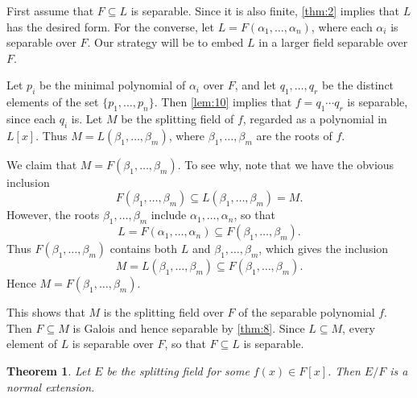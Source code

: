 \documentclass[leqno]{article}
\makeatletter
\newtheorem{theorem}{Theorem}
\theoremstyle{definition}
\theoremstyle{remark}
\let\oldproofname=\proofname
\renewcommand{\proofname}{\textit{\oldproofname}}
\theoremstyle{definition}
\renewenvironment{proof}[1][\proofname]{\par
  \pushQED{\qed}%
  \normalfont \topsep6\p@\@plus6\p@\relax
  \list{}{\leftmargin=0mm
          \rightmargin=0mm
          \settowidth{\itemindent}{\itshape#1}%
          \labelwidth=\itemindent
          \parsep=0pt \listparindent=0mm%
  }
  \item[\hskip\labelsep
        \itshape
    #1\@addpunct{.}]\ignorespaces
}{%
  \popQED\endlist\@endpefalse
}
\makeatother
\begin{document}
        \begin{proof}
            First assume that $F\subseteq L$ is separable. Since it is also finite, \cref{thm:2} implies that $L$ has the desired form. For the converse, let $L=F(\alpha_1,\dots,\alpha_n)$, where each $\alpha_i$ is separable over $F$. Our strategy will be to embed $L$ in a larger field separable over $F$.\par\hspace{4mm} Let $p_i$ be the minimal polynomial of $\alpha_i$ over $F$, and let $q_1,\dots,q_r$ be the distinct elements of the set $\{p_1,\dots,p_n\}$. Then \cref{lem:10} implies that $f=q_1\cdots q_r$ is separable, since each $q_i$ is. Let $M$ be the splitting field of $f$, regarded as a polynomial in $L[x]$. Thus $M=L(\beta_1,\dots,\beta_m)$, where $\beta_1,\dots,\beta_m$ are the roots of $f$.\par\hspace{4mm} We claim that $M=F(\beta_1,\dots,\beta_m)$. To see why, note that we have the obvious inclusion
                \begin{equation*}
                    F(\beta_1,\dots,\beta_m)\subseteq L(\beta_1,\dots,\beta_m)=M.
                \end{equation*}
            However, the roots $\beta_1,\dots,\beta_m$ include $\alpha_1,\dots,\alpha_n$, so that 
                \begin{equation*}
                    L=F(\alpha_1,\dots,\alpha_n)\subseteq F(\beta_1,\dots,\beta_m).
                \end{equation*}
            Thus $F(\beta_1,\dots,\beta_m)$ contains both $L$ and $\beta_1,\dots,\beta_m$, which gives the inclusion
                \begin{equation*}
                    M=L(\beta_1,\dots,\beta_m)\subseteq F(\beta_1,\dots,\beta_m).
                \end{equation*}
            Hence $M=F(\beta_1,\dots,\beta_m)$.\par\hspace{4mm} This shows that $M$ is the splitting field over $F$ of the separable polynomial $f$. Then $F\subseteq M$ is Galois and hence separable by \cref{thm:8}. Since $L\subseteq M$, every element of $L$ is separable over $F$, so that $F\subseteq L$ is separable.
        \end{proof}
    \begin{theorem}\label{thm:10}
        Let $E$ be the splitting field for some $f(x)\in F[x]$. Then $E/F$ is a normal extension.
    \end{theorem}
        \begin{proof}
            
        \end{proof}
\end{document}
